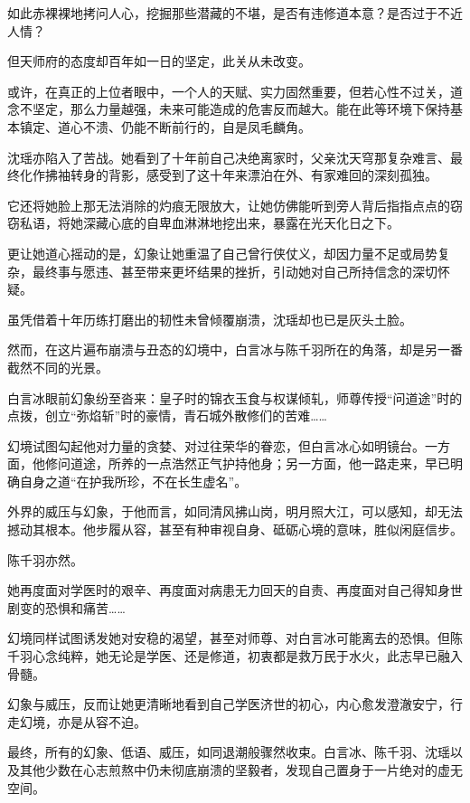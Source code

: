 如此赤裸裸地拷问人心，挖掘那些潜藏的不堪，是否有违修道本意？是否过于不近人情？

但天师府的态度却百年如一日的坚定，此关从未改变。

或许，在真正的上位者眼中，一个人的天赋、实力固然重要，但若心性不过关，道念不坚定，那么力量越强，未来可能造成的危害反而越大。能在此等环境下保持基本镇定、道心不溃、仍能不断前行的，自是凤毛麟角。

\vspace{2em}

沈瑶亦陷入了苦战。她看到了十年前自己决绝离家时，父亲沈天穹那复杂难言、最终化作拂袖转身的背影，感受到了这十年来漂泊在外、有家难回的深刻孤独。

它还将她脸上那无法消除的灼痕无限放大，让她仿佛能听到旁人背后指指点点的窃窃私语，将她深藏心底的自卑血淋淋地挖出来，暴露在光天化日之下。

更让她道心摇动的是，幻象让她重温了自己曾行侠仗义，却因力量不足或局势复杂，最终事与愿违、甚至带来更坏结果的挫折，引动她对自己所持信念的深切怀疑。

虽凭借着十年历练打磨出的韧性未曾倾覆崩溃，沈瑶却也已是灰头土脸。

然而，在这片遍布崩溃与丑态的幻境中，白言冰与陈千羽所在的角落，却是另一番截然不同的光景。

白言冰眼前幻象纷至沓来：皇子时的锦衣玉食与权谋倾轧，师尊传授“问道途”时的点拨，创立“弥焰斩”时的豪情，青石城外散修们的苦难……

幻境试图勾起他对力量的贪婪、对过往荣华的眷恋，但白言冰心如明镜台。一方面，他修问道途，所养的一点浩然正气护持他身；另一方面，他一路走来，早已明确自身之道“在护我所珍，不在长生虚名”。

外界的威压与幻象，于他而言，如同清风拂山岗，明月照大江，可以感知，却无法撼动其根本。他步履从容，甚至有种审视自身、砥砺心境的意味，胜似闲庭信步。

陈千羽亦然。

她再度面对学医时的艰辛、再度面对病患无力回天的自责、再度面对自己得知身世剧变的恐惧和痛苦……

幻境同样试图诱发她对安稳的渴望，甚至对师尊、对白言冰可能离去的恐惧。但陈千羽心念纯粹，她无论是学医、还是修道，初衷都是救万民于水火，此志早已融入骨髓。

幻象与威压，反而让她更清晰地看到自己学医济世的初心，内心愈发澄澈安宁，行走幻境，亦是从容不迫。

\vspace{2em}

最终，所有的幻象、低语、威压，如同退潮般骤然收束。白言冰、陈千羽、沈瑶以及其他少数在心志煎熬中仍未彻底崩溃的坚毅者，发现自己置身于一片绝对的虚无空间。

